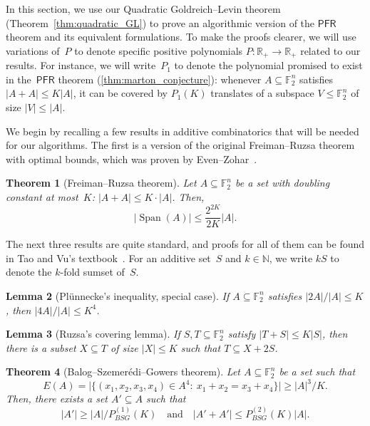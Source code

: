 \documentclass[11pt]{amsart}
\newcommand{\R}{\mathbb{R}} %
\newcommand{\N}{\mathbb{N}} %
\newcommand{\F}{\mathbb{F}} %
\DeclareMathOperator{\vspan}{Span} %
\newcommand{\PFR}{\textsf{PFR}}
\theoremstyle{plain}
\newtheorem{theorem}{Theorem}[section]
\newtheorem{lemma}[theorem]{Lemma}
\theoremstyle{definition}
\theoremstyle{remark}
\begin{document}
In this section, we use our Quadratic Goldreich--Levin theorem (Theorem~\ref{thm:quadratic_GL}) to prove an algorithmic version of the $\PFR$ theorem and its equivalent formulations.
To make the proofs clearer, we will use variations of~$P$ to denote specific positive polynomials $P: \R_+ \to \R_+$ related to our results.
For instance, we will write~$P_1$ to denote the polynomial promised to exist in the~$\PFR$ theorem (\cref{thm:marton_conjecture}):
whenever $A \subseteq \F_2^{n}$ satisfies $|A + A| \leq K |A|$, it can be covered by $P_1(K)$ translates of a subspace $V \leq \F_2^n$ of size $|V|\leq |A|$.

We begin by recalling a few results in additive combinatorics that will be needed for our algorithms.
The first is a version of the original Freiman--Ruzsa theorem with optimal bounds, which was proven by Even--Zohar~\cite{even2012sums}.

\begin{theorem}[Freiman--Ruzsa theorem]
\label{thm:spanAsize}
    Let $A\subseteq \F_2^n$ be a set with doubling constant at most~$K$:
    $|A+A|\leq K\cdot |A|$.
    Then,
    $$|\vspan(A)| \leq  \frac{2^{2K}}{2K} |A|.$$
\end{theorem}

The next three results are quite standard, and proofs for all of them can be found in Tao and Vu's textbook~\cite{tao2006additive}.
For an additive set~$S$ and $k\in \N$, we write $kS$ to denote the $k$-fold sumset of~$S$.

\begin{lemma}[Pl\"unnecke's inequality, special case]
\label{lem:4Asize}
    If $A \subseteq \F_2^{n}$ satisfies $|2A|/|A| \leq K$, then $|4A|/|A| \leq K^4$.
\end{lemma}

\begin{lemma}[Ruzsa's covering lemma]
\label{lem:ruzsacovering}
    If $S, T \subseteq \F_2^n$ satisfy $|T+S| \leq K|S|$, then there is a subset $X \subseteq T$ of size $|X| \leq K$ such that $T \subseteq X + 2S$.
\end{lemma}

\begin{theorem}[Balog--Szemer\'{e}di--Gowers theorem]
\label{thm:BSG}
    Let $A \subseteq \F_2^n$ be a set such that
    $$E(A) = \big|\big\{(x_1, x_2, x_3, x_4)\in A^4:\: x_1+x_2 = x_3+x_4\big\}\big| \geq |A|^3/K.$$
    Then, there exists a set $A' \subseteq A$ such that
    $$|A'| \geq |A|/P_{BSG}^{(1)}(K) \quad \text{and} \quad |A'+A'| \leq P_{BSG}^{(2)}(K) |A|.$$
\end{theorem}
\end{document}
